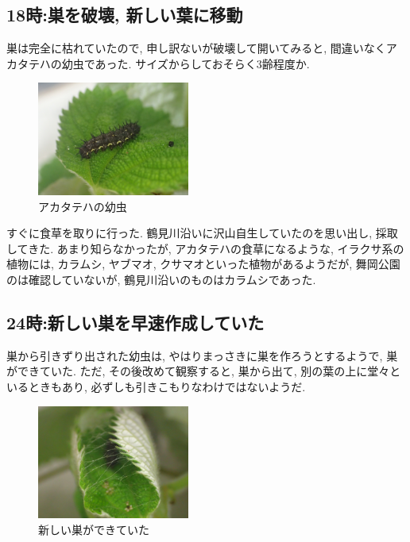 \documentclass{jsarticle}
\begin{document}
\subsection{18時:巣を破壊, 新しい葉に移動}
巣は完全に枯れていたので, 申し訳ないが破壊して開いてみると, 間違いなくアカタテハの幼虫であった. サイズからしておそらく3齢程度か. 

\begin{figure}[htbp]
  \begin{center}
    \includegraphics[width=5cm]{photo1/Larva.JPG}
  \end{center}
  \caption{アカタテハの幼虫}
\end{figure}

すぐに食草を取りに行った. 鶴見川沿いに沢山自生していたのを思い出し, 採取してきた. 
あまり知らなかったが, アカタテハの食草になるような, イラクサ系の植物には, カラムシ, ヤブマオ, クサマオといった植物があるようだが, 舞岡公園のは確認していないが, 鶴見川沿いのものはカラムシであった. 

\subsection{24時:新しい巣を早速作成していた}
巣から引きずり出された幼虫は, やはりまっさきに巣を作ろうとするようで, 巣ができていた. 
ただ, その後改めて観察すると, 巣から出て, 別の葉の上に堂々といるときもあり, 必ずしも引きこもりなわけではないようだ. 

\begin{figure}[htbp]
  \begin{center}
    \includegraphics[width=5cm]{photo1/Larva-nest.JPG}
  \end{center}
  \caption{新しい巣ができていた}
\end{figure}
\end{document}
